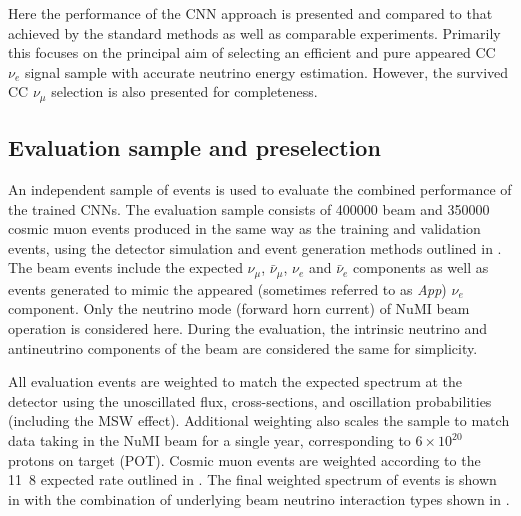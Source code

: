 Here the performance of the CNN approach is presented and compared to that achieved by the
standard \chips methods as well as comparable experiments. Primarily this focuses on the principal
aim of selecting an efficient and pure appeared CC $\nu_{e}$ signal sample with accurate neutrino
energy estimation. However, the survived CC $\nu_{\mu}$ selection is also presented for
completeness.

\subsection{Evaluation sample and preselection} %
\label{sec:results_eval_sample} %

An independent sample of events is used to evaluate the combined performance of the trained CNNs.
The evaluation sample consists of 400000 beam and 350000 cosmic muon events produced in the same
way as the training and validation events, using the detector simulation and event generation
methods outlined in . The beam events include the expected
$\nu_{\mu}$, $\bar{\nu}_{\mu}$, $\nu_{e}$ and $\bar{\nu}_{e}$ components as well as events
generated to mimic the appeared (sometimes referred to as \emph{App}) $\nu_{e}$ component. Only
the neutrino mode (forward horn current) of NuMI beam operation is considered here. During the
evaluation, the intrinsic neutrino and antineutrino components of the beam are considered the same
for simplicity.

All evaluation events are weighted to match the expected spectrum at the \chipsfive detector using
the unoscillated flux, cross-sections, and oscillation probabilities (including the MSW effect).
Additional weighting also scales the sample to match data taking in the NuMI beam for a single
year, corresponding to $6\times 10^{20}$ protons on target (POT). Cosmic muon events are weighted
according to the \unit{11.8}{} expected \chipsfive rate outlined in
. The final weighted spectrum of events is shown in
 with the combination of underlying beam neutrino interaction
types shown in .

